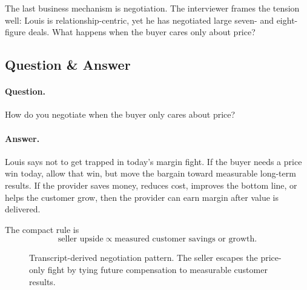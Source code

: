 The last business mechanism is negotiation. The interviewer frames the tension well: Louis is relationship-centric, yet he has negotiated large seven- and eight-figure deals. What happens when the buyer cares only about price?

\subsection{Question \& Answer}

\paragraph{Question.} How do you negotiate when the buyer only cares about price?

\paragraph{Answer.} Louis says not to get trapped in today's margin fight. If the buyer needs a price win today, allow that win, but move the bargain toward measurable long-term results. If the provider saves money, reduces cost, improves the bottom line, or helps the customer grow, then the provider can earn margin after value is delivered.

The compact rule is
\begin{equation}
\text{seller upside}
\propto
\text{measured customer savings or growth}.
\end{equation}

\begin{figure}
\centering
{}
\caption{Transcript-derived negotiation pattern. The seller escapes the price-only fight by tying future compensation to measurable customer results.}
\end{figure}

